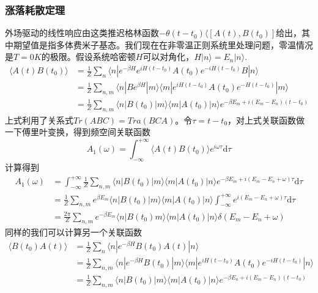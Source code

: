 \documentclass{article}
\numberwithin{equation}{subsection}
\begin{document}
\subsubsection{涨落耗散定理}
外场驱动的线性响应由这类推迟格林函数$-\theta(t-t_0)\langle[A(t),B(t_0)]$给出，其中期望值是指多体费米子基态。我们现在在非零温正则系统里处理问题，零温情况是$T=0K$的极限。假设系统哈密顿$H$可以对角化，$H|n\rangle=E_n|n\rangle$.
\begin{equation}
    \begin{split}
        \langle A(t)B(t_0)\rangle&=\frac{1}{Z}\sum_n\langle n|e^{-\beta H}e^{iH(t-t_0)}A(t_0)e^{-iH(t-t_0)}B|n\rangle\\
        &=\frac{1}{Z}\sum_{n,m}\langle n|Be^{\beta H}|m\rangle\langle m|e^{iH(t-t_0)}A(t_0)e^{-H(t-t_0)}|m\rangle\\
        &=\frac{1}{Z}\sum_{n,m}\langle n|B(t_0)|m\rangle\langle m|A(t_0)|n\rangle e^{-\beta E_m+i(E_m-E_n)(t-t_0)}
    \end{split}
\end{equation}
上式利用了关系式$Tr(ABC)=Tra(BCA)$。令$\tau=t-t_0$，对上式关联函数做一下傅里叶变换，得到频空间关联函数
\begin{equation}
    A_1(\omega)=\int_{-\infty}^{+\infty}\langle A(t)B(t_0)\rangle e^{i\omega\tau}\mathrm{d}\tau
\end{equation}
计算得到
\begin{equation}
    \begin{split}
        A_1(\omega)&=\int_{-\infty}^{+\infty}\frac{1}{Z}\sum_{n,m}\langle n|B(t_0)|m\rangle\langle m|A(t_0)|n\rangle e^{-\beta E_m+i(E_m-E_n+\omega)\tau}\mathrm{d}\tau\\
        &=\frac{1}{Z}\sum_{n,m}e^{\beta E_m}\langle n|B(t_0)|m\rangle\langle m|A(t_0)|n\rangle\int_{-\infty}^{+\infty}e^{i(E_m-E_n+\omega)\tau}\mathrm{d}\tau\\
        &=\frac{2\pi}{Z}\sum_{n,m}e^{-\beta E_m}\langle n|B(t_0)m\rangle\langle m|A(t_0)|n\rangle\delta(E_m-E_n+\omega)
    \end{split}
\end{equation}
同样的我们可以计算另一个关联函数
\begin{equation}
    \begin{split}
        \langle B(t_0)A(t)\rangle&=\frac{1}{Z}\sum_{n}\langle n|e^{-\beta H}B(t_0)A(t)|n\rangle\\
        &=\frac{1}{Z}\sum_{n,m}\langle n|e^{-\beta H}B(t_0)|m\rangle\langle m|e^{iH(t-t_0)}A(t_0)e^{-iH(t-t_0)}|n\rangle\\
        &=\frac{1}{Z}\sum_{n,m}\langle n|B(t_0)|m\rangle\langle m|A(t_0)|n\rangle e^{-\beta E_n+i(E_m-E_n)(t-t_0)}
    \end{split}
\end{equation}
\end{document}
